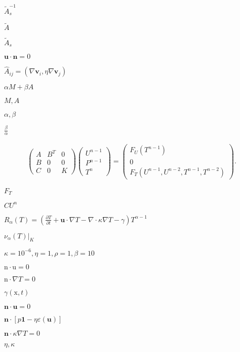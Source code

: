 \documentclass{article}
\begin{document}
$\tilde A_s^{-1}$
\pagebreak

$\tilde A$
\pagebreak

$\tilde A_s$
\pagebreak

$\mathbf u \cdot \mathbf n = 0$
\pagebreak

$\hat A_{ij} = (\nabla {\mathbf v}_i, \eta \nabla {\mathbf v}_j)$
\pagebreak

$\alpha M + \beta A$
\pagebreak

$M,A$
\pagebreak

$\alpha,\beta$
\pagebreak

$\frac\beta\alpha$
\pagebreak

\begin{eqnarray*} \left(\begin{array}{ccc} A & B^T & 0 \\ B & 0 &0 \\ C & 0 & K \end{array}\right) \left(\begin{array}{ccc} U^{n-1} \\ P^{n-1} \\ T^n \end{array}\right) = \left(\begin{array}{ccc} F_U(T^{n-1}) \\ 0 \\ F_T(U^{n-1},U^{n-2},T^{n-1},T^{n-2}) \end{array}\right). \end{eqnarray*}
\pagebreak

$F_T$
\pagebreak

$CU^n$
\pagebreak

$ R_\alpha(T) = \left( \frac{\partial T}{\partial t} + {\mathbf u} \cdot \nabla T - \nabla \cdot \kappa \nabla T - \gamma \right) T^{\alpha-1} $
\pagebreak

$\nu_\alpha(T)|_K$
\pagebreak

$\kappa=10^{-6}, \eta=1, \rho=1, \beta=10$
\pagebreak

$\mathrm{n}\cdot\mathrm{u}=0$
\pagebreak

$\mathrm{n}\cdot\nabla T=0$
\pagebreak

$\gamma(\mathrm{x},t)$
\pagebreak

$\mathbf{n}\cdot\mathbf{u}=0$
\pagebreak

$\textbf{n} \cdot [p \textbf{1} - \eta\varepsilon(\textbf{u})]$
\pagebreak

$\mathbf{n} \cdot \kappa \nabla T=0$
\pagebreak

$\eta,\kappa$
\pagebreak
\end{document}
